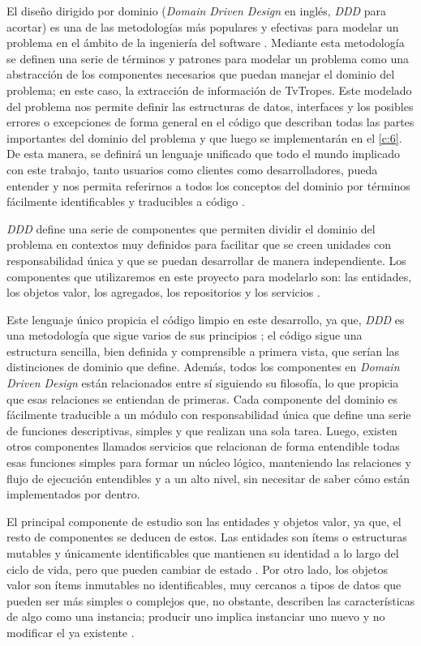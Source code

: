 El diseño dirigido por dominio (\textit{Domain Driven Design} en inglés,
\textit{DDD} para acortar) es una de las metodologías más populares y efectivas
para modelar un problema en el ámbito de la ingeniería del software
\cite{ddd_golang}. Mediante esta metodología se definen una serie de términos y
patrones para modelar un problema como una abstracción de los componentes
necesarios que puedan manejar el dominio del problema; en este caso, la
extracción de información de TvTropes. Este modelado del problema nos permite
definir las estructuras de datos, interfaces y los posibles errores o
excepciones de forma general en el código que describan todas las partes
importantes del dominio del problema y que luego se implementarán en el
\autoref{c:6}. De esta manera, se definirá un lenguaje unificado que todo el
mundo implicado con este trabajo, tanto usuarios como clientes como
desarrolladores, pueda entender y nos permita referirnos a todos los conceptos
del dominio por términos fácilmente identificables y traducibles a código
\cite{ddd_golang}.

\textit{DDD} define una serie de componentes que permiten dividir el dominio del
problema en contextos muy definidos para facilitar que se creen unidades con
responsabilidad única y que se puedan desarrollar de manera independiente. Los
componentes que utilizaremos en este proyecto para modelarlo son: las entidades,
los objetos valor, los agregados, los repositorios y los servicios
\cite{ddd_golang}. 

Este lenguaje único propicia el código limpio en este desarrollo, ya que,
\textit{DDD} es una metodología que sigue varios de sus principios
\cite{clean_code_rules}; el código sigue una estructura sencilla, bien definida
y comprensible a primera vista, que serían las distinciones de dominio que
define. Además, todos los componentes en \textit{Domain Driven Design} están
relacionados entre sí siguiendo su filosofía, lo que propicia que esas
relaciones se entiendan de primeras. Cada componente del dominio es fácilmente
traducible a un módulo con responsabilidad única que define una serie de
funciones descriptivas, simples y que realizan una sola tarea. Luego, existen
otros componentes llamados servicios que relacionan de forma entendible todas
esas funciones simples para formar un núcleo lógico, manteniendo las relaciones
y flujo de ejecución entendibles y a un alto nivel, sin necesitar de saber cómo
están implementados por dentro.

El principal componente de estudio son las entidades y objetos valor, ya que, el
resto de componentes se deducen de estos. Las entidades son ítems o estructuras
mutables y únicamente identificables que mantienen su identidad a lo largo del
ciclo de vida, pero que pueden cambiar de estado \cite{jannik_ddd}. Por otro
lado, los objetos valor son ítems inmutables no identificables, muy cercanos a
tipos de datos que pueden ser más simples o complejos que, no obstante,
describen las características de algo como una instancia; producir uno implica
instanciar uno nuevo y no modificar el ya existente \cite{jannik_ddd}.

